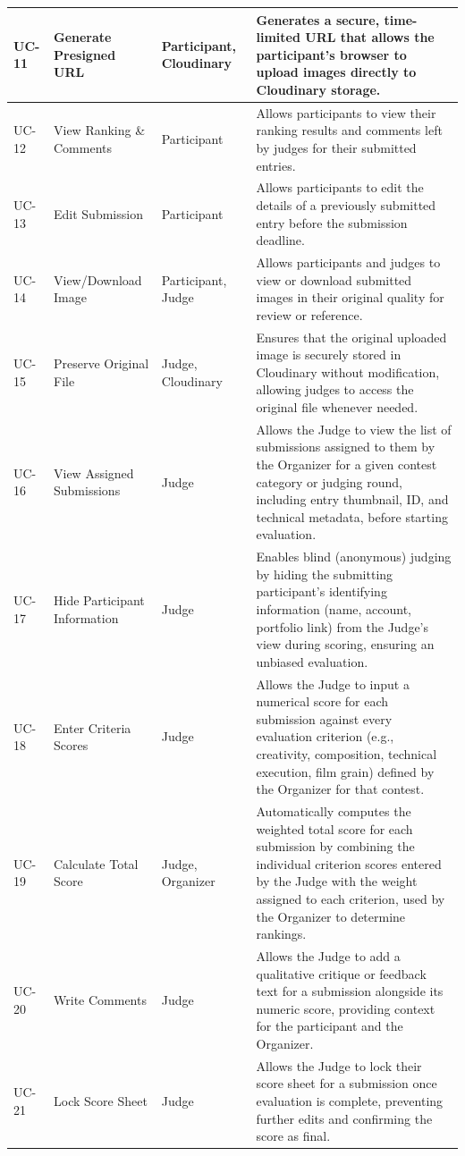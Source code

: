 \begin{longtable}{|>{\centering\arraybackslash}p{}|>{\raggedright\arraybackslash}p{}|>{\raggedright\arraybackslash}p{}|>{\raggedright\arraybackslash}p{}|}
\hline
UC-11 & Generate Presigned URL & Participant, Cloudinary & Generates a secure, time-limited URL that allows the participant's browser to upload images directly to Cloudinary storage. \\
\hline
UC-12 & View Ranking \& Comments & Participant & Allows participants to view their ranking results and comments left by judges for their submitted entries. \\
\hline
UC-13 & Edit Submission & Participant & Allows participants to edit the details of a previously submitted entry before the submission deadline. \\
\hline
UC-14 & View/Download Image & Participant, Judge & Allows participants and judges to view or download submitted images in their original quality for review or reference. \\
\hline
UC-15 & Preserve Original File & Judge, Cloudinary & Ensures that the original uploaded image is securely stored in Cloudinary without modification, allowing judges to access the original file whenever needed. \\
\hline
UC-16 & View Assigned Submissions & Judge & Allows the Judge to view the list of submissions assigned to them by the Organizer for a given contest category or judging round, including entry thumbnail, ID, and technical metadata, before starting evaluation. \\
\hline
UC-17 & Hide Participant Information & Judge & Enables blind (anonymous) judging by hiding the submitting participant's identifying information (name, account, portfolio link) from the Judge's view during scoring, ensuring an unbiased evaluation. \\
\hline
UC-18 & Enter Criteria Scores & Judge & Allows the Judge to input a numerical score for each submission against every evaluation criterion (e.g., creativity, composition, technical execution, film grain) defined by the Organizer for that contest. \\
\hline
UC-19 & Calculate Total Score & Judge, Organizer & Automatically computes the weighted total score for each submission by combining the individual criterion scores entered by the Judge with the weight assigned to each criterion, used by the Organizer to determine rankings. \\
\hline
UC-20 & Write Comments & Judge & Allows the Judge to add a qualitative critique or feedback text for a submission alongside its numeric score, providing context for the participant and the Organizer. \\
\hline
UC-21 & Lock Score Sheet & Judge & Allows the Judge to lock their score sheet for a submission once evaluation is complete, preventing further edits and confirming the score as final. \\

\end{longtable}
